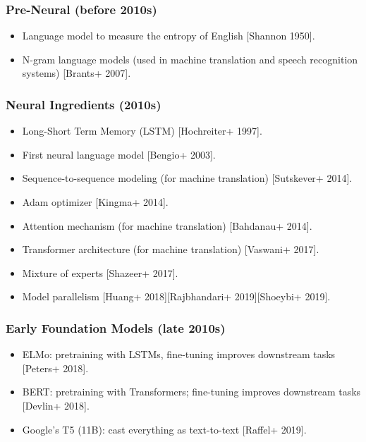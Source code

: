 \documentclass[12pt,twoside]{article}
\begin{document}
\subsubsection*{Pre-Neural (before 2010s)}

\begin{itemize}
    \item Language model to measure the entropy of English [Shannon 1950].
    \item N-gram language models (used in machine translation and speech recognition systems) [Brants+ 2007].
\end{itemize}

\subsubsection*{Neural Ingredients (2010s)}

\begin{itemize}
    \item Long-Short Term Memory (LSTM) [Hochreiter+ 1997].
    \item First neural language model [Bengio+ 2003].
    \item Sequence-to-sequence modeling (for machine translation) [Sutskever+ 2014].
    \item Adam optimizer [Kingma+ 2014].
    \item Attention mechanism (for machine translation) [Bahdanau+ 2014].
    \item Transformer architecture (for machine translation) [Vaswani+ 2017].
    \item Mixture of experts [Shazeer+ 2017].
    \item Model parallelism [Huang+ 2018][Rajbhandari+ 2019][Shoeybi+ 2019].
\end{itemize}

\subsubsection*{Early Foundation Models (late 2010s)}

\begin{itemize}
    \item ELMo: pretraining with LSTMs, fine-tuning improves downstream tasks [Peters+ 2018].
    \item BERT: pretraining with Transformers; fine-tuning improves downstream tasks [Devlin+ 2018].
    \item Google's T5 (11B): cast everything as text-to-text [Raffel+ 2019].
\end{itemize}
\end{document}
